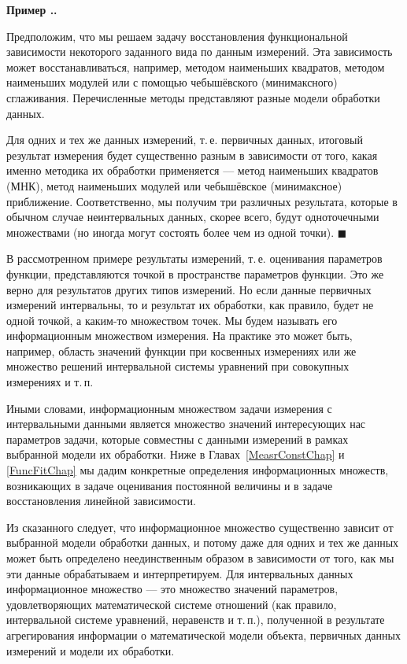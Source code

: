 \documentclass[a5paper,openany]{book}
\newcounter{ExmpNum}[section]
\renewcommand{\theExmpNum}{\thesection.\arabic{ExmpNum}}
\newenvironment{example}%
  {\refstepcounter{ExmpNum}%
  \par\addvspace{\medskipamount} 
  \noindent\textbf{Пример {\theExmpNum}.}
  }%
  {\hfill$\blacksquare$\par\medskip}
\begin{document}
\begin{example}
Предположим, что мы решаем задачу восстановления функциональной зависимости некоторого 
заданного вида по данным измерений. Эта зависимость может восстанавливаться, например, 
методом наименьших квадратов, методом наименьших модулей или с помощью чебышёвского 
(минимаксного) сглаживания. Перечисленные методы представляют разные модели обработки 
данных.   
  
Для одних и тех же данных измерений, т.\,е. первичных данных, итоговый результат 
измерения будет существенно разным в зависимости от того, какая именно методика их 
обработки применяется --- метод наименьших квадратов (МНК), метод наименьших модулей 
или чебышёвское (минимаксное) приближение. Соответственно, мы получим три различных 
результата, которые в обычном случае неинтервальных данных, скорее всего, будут 
одноточечными множествами (но иногда могут состоять более чем из одной точки). 
\end{example}  
  
В рассмотренном примере результаты измерений, т.\,е. оценивания параметров функции, 
представляются точкой в пространстве параметров функции. Это же верно для результатов 
других типов измерений. Но если данные первичных измерений интервальны, то и результат 
их обработки, как правило, будет не одной точкой, а каким-то множеством точек. Мы 
будем называть его информационным множеством измерения. На практике это может быть, 
например, область значений функции при косвенных измерениях или же множество решений 
интервальной системы уравнений при совокупных измерениях и т.\,п.  
  
Иными словами, информационным множеством задачи измерения с интервальными данными 
является множество значений интересующих нас параметров задачи, которые совместны 
с данными измерений в рамках выбранной модели их обработки. Ниже 
в Главах~\ref{MeasrConstChap} и \ref{FuncFitChap} мы дадим конкретные 
определения информационных множеств, возникающих в задаче оценивания 
постоянной величины и в задаче восстановления линейной зависимости. 
    
Из сказанного следует, что информационное множество существенно зависит от выбранной 
модели обработки данных, и потому даже для одних и тех же данных может быть определено 
неединственным образом в зависимости от того, как мы эти данные обрабатываем и 
интерпретируем. Для интервальных данных информационное множество --- это множество 
значений параметров, удовлетворяющих математической системе отношений (как правило, 
интервальной системе уравнений, неравенств и т.\,п.), полученной в результате 
агрегирования информации о математической модели объекта, первичных данных измерений 
и модели их обработки.           
  
\end{document}

